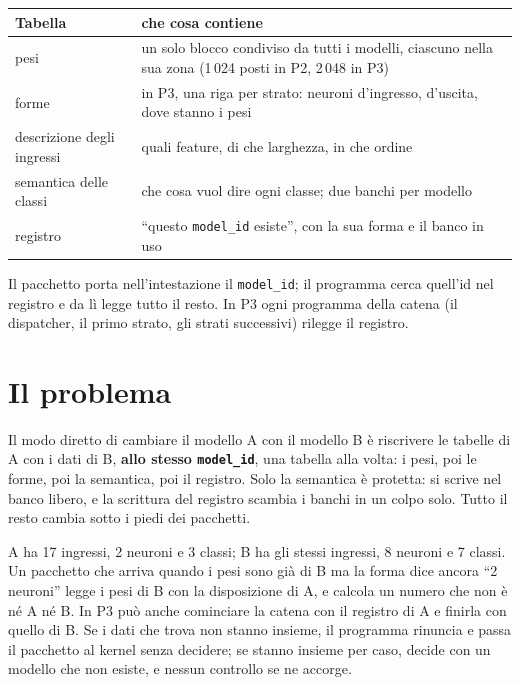 \documentclass[11pt,a4paper,oneside]{report}
\begin{document}
\begin{center}
\small
\begin{tabular}{@{}lp{9.6cm}@{}}
\toprule
\textbf{Tabella} & \textbf{che cosa contiene} \\
\midrule
pesi & un solo blocco condiviso da tutti i modelli, ciascuno nella sua zona
       (1\,024 posti in P2, 2\,048 in P3) \\
forme & in P3, una riga per strato: neuroni d'ingresso, d'uscita, dove stanno i pesi \\
descrizione degli ingressi & quali feature, di che larghezza, in che ordine \\
semantica delle classi & che cosa vuol dire ogni classe; due banchi per modello \\
registro & ``questo \texttt{model\_id} esiste'', con la sua forma e il banco in uso \\
\bottomrule
\end{tabular}
\end{center}

Il pacchetto porta nell'intestazione il \texttt{model\_id}; il programma cerca
quell'id nel registro e da lì legge tutto il resto. In P3 ogni programma della
catena (il dispatcher, il primo strato, gli strati successivi) rilegge il registro.

\section{Il problema}

Il modo diretto di cambiare il modello A con il modello B è riscrivere le
tabelle di A con i dati di B, \textbf{allo stesso \texttt{model\_id}}, una
tabella alla volta: i pesi, poi le forme, poi la semantica, poi il registro. Solo
la semantica è protetta: si scrive nel banco libero, e la scrittura del registro
scambia i banchi in un colpo solo. Tutto il resto cambia sotto i piedi dei
pacchetti.

\begin{prima}[Un esempio]
A ha 17 ingressi, 2 neuroni e 3 classi; B ha gli stessi ingressi, 8 neuroni e 7
classi. Un pacchetto che arriva quando i pesi sono già di B ma la forma dice ancora
``2 neuroni'' legge i pesi di B con la disposizione di A, e calcola un numero che
non è né A né B. In P3 può anche cominciare la catena con il registro di A e
finirla con quello di B. Se i dati che trova non stanno insieme, il programma
rinuncia e passa il pacchetto al kernel senza decidere; se stanno insieme per
caso, decide con un modello che non esiste, e nessun controllo se ne accorge.
\end{prima}
\end{document}
